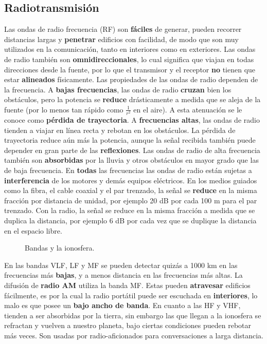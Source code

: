 \documentclass[
	12pt, %
	fleqn, %
	a4paper, %
]{LegrandOrangeBook}
\begin{document}
\subsection{Radiotransmisión}
Las ondas de radio frecuencia (RF) son \textbf{fáciles} de generar, pueden recorrer distancias largas y \textbf{penetrar}
edificios con facilidad, de modo que son muy utilizados en la comunicación, tanto en interiores como en exteriores. Las ondas de radio también son \textbf{omnidireccionales}, lo cual significa que viajan en todas direcciones desde la fuente, por lo que el transmisor y el receptor \textbf{no} tienen que estar \textbf{alineados} físicamente. Las propiedades de las ondas de radio dependen de la frecuencia. A \textbf{bajas frecuencias}, las ondas de radio \textbf{cruzan} bien los obstáculos, pero la potencia se \textbf{reduce} drásticamente a medida que se aleja de la
fuente (por lo menos tan rápido como $\frac{1}{r^2}$ en el aire). A esta atenuación se le conoce como \textbf{pérdida de trayectoria}. A \textbf{frecuencias altas}, las ondas de radio tienden a viajar en línea recta y rebotan en los obstáculos. La pérdida de trayectoria reduce aún más la potencia, aunque la señal recibida también puede depender en gran parte de las \textbf{reflexiones}. Las ondas de radio de alta frecuencia también son \textbf{absorbidas} por la lluvia y otros obstáculos en mayor grado que las de baja frecuencia. En \textbf{todas} las frecuencias las ondas de radio están sujetas a \textbf{interferencia} de los motores y demás equipos eléctricos. En los medios guiados como la fibra, el cable coaxial y el par trenzado, la señal se \textbf{reduce} en la misma fracción por distancia de unidad, por ejemplo 20 dB por cada 100 m para el par trenzado. Con la radio, la señal se reduce en la misma fracción a medida que se duplica la distancia, por ejemplo 6 dB por cada vez que se duplique la distancia en el espacio libre.
\begin{figure}[H]
\centering
{}
\caption{Bandas y la ionosfera.}
\label{fig:tipos de repetidor}
\end{figure}
En las bandas VLF, LF y MF se pueden detectar quizás a 1000 km en las frecuencias más \textbf{bajas}, y a menos distancia en las frecuencias más altas. La difusión de \textbf{radio AM} utiliza la banda MF. Estas pueden \textbf{atravesar} edificios fácilmente, es por la cual la radio portátil puede ser escuchada en \textbf{interiores}, lo malo es que posee un \textbf{bajo ancho de banda}. En cuanto a las HF y VHF, tienden a ser absorbidas por la tierra, sin embargo las que llegan a la ionosfera se refractan y vuelven a nuestro planeta, bajo ciertas condiciones pueden rebotar más veces. Son usadas por radio-aficionados para conversaciones a larga distancia.
\end{document}

